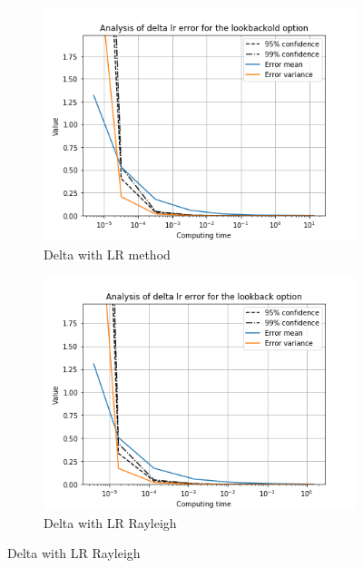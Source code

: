 \documentclass[11pt,a4paper,fleqn]{article}
\begin{document}
\begin{figure}[h!]
  \centering
      \begin{subfigure}[b]{0.45\textwidth}
          \includegraphics[width=\textwidth]{graphs/lookbackolddeltalrtime.png}
          \caption{Delta with LR method}
      \end{subfigure}
      \begin{subfigure}[b]{0.45\textwidth}
          \includegraphics[width=\textwidth]{graphs/lookbackdeltalrtime.png}
          \caption{Delta with LR Rayleigh}
      \end{subfigure}


\end{figure}
\end{document}
